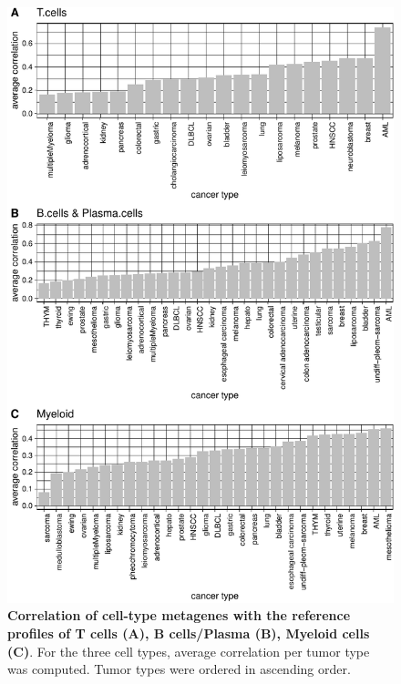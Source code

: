 \documentclass[12pt,]{book}
\theoremstyle{definition}
\theoremstyle{definition}
\theoremstyle{definition}
\theoremstyle{remark}
\begin{document}
\begin{figure}

{\centering \includegraphics{UCzPhDThesis_files/figure-latex/corrbar-1} 

}

\caption[Correlation of cell-type metagenes with the refrence profiles]{\textbf{Correlation of cell-type metagenes with
the reference profiles of T cells (A), B cells/Plasma (B), Myeloid cells
(C)}. For the three cell types, average correlation per tumor type was
computed. Tumor types were ordered in ascending order.}\label{fig:corrbar}
\end{figure}
\end{document}
